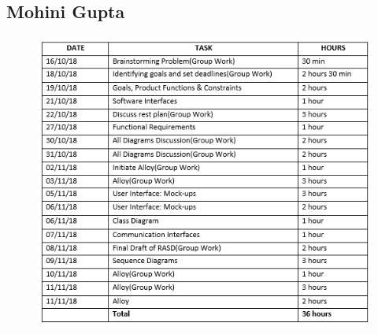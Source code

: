 \subsection{Mohini Gupta}
\begin{figure}[H]
	\begin{center}
		\includegraphics[width=\textwidth]{./RASD_Diagrams/Effort_Mohini.PNG}
	\end{center}
\end{figure}
